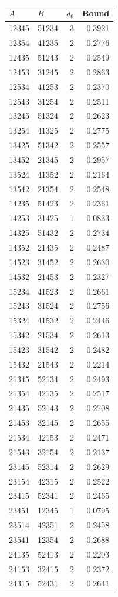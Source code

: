 \begin{tabular}{@{}llrr@{}}
\toprule
$A$&$B$&$d_6$&Bound\\
\midrule
12345&51234&3&0.3921\\
12354&41235&2&0.2776\\
12435&51243&2&0.2549\\
12453&31245&2&0.2863\\
12534&41253&2&0.2370\\
12543&31254&2&0.2511\\
13245&51324&2&0.2623\\
13254&41325&2&0.2775\\
13425&51342&2&0.2557\\
13452&21345&2&0.2957\\
13524&41352&2&0.2164\\
13542&21354&2&0.2548\\
14235&51423&2&0.2361\\
14253&31425&1&0.0833\\
14325&51432&2&0.2734\\
14352&21435&2&0.2487\\
14523&31452&2&0.2630\\
14532&21453&2&0.2327\\
15234&41523&2&0.2661\\
15243&31524&2&0.2756\\
15324&41532&2&0.2446\\
15342&21534&2&0.2613\\
15423&31542&2&0.2482\\
15432&21543&2&0.2214\\
21345&52134&2&0.2493\\
21354&42135&2&0.2517\\
21435&52143&2&0.2708\\
21453&32145&2&0.2655\\
21534&42153&2&0.2471\\
21543&32154&2&0.2137\\
23145&52314&2&0.2629\\
23154&42315&2&0.2522\\
23415&52341&2&0.2465\\
23451&12345&1&0.0795\\
23514&42351&2&0.2458\\
23541&12354&2&0.2688\\
24135&52413&2&0.2203\\
24153&32415&2&0.2372\\
24315&52431&2&0.2641\\

\end{tabular}
